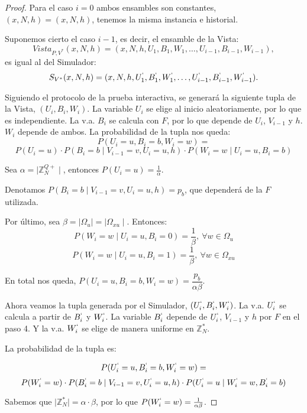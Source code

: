 \begin{proof}
	Para el caso $i=0$ ambos ensambles son constantes, $(x,N,h)=(x,N,h)$, tenemos la misma instancia e historial.
	
	Suponemos cierto el caso $i-1$, es decir, el ensamble de la Vista:
	\[ Vista_{P,V^*}(x,N,h) = (x,N,h,U_1,B_1,W_1,\dots , U_{i-1}, B_{i-1}, W_{i-1}), \]
	es igual al del Simulador:
	\[ S_{V^*}(x,N,h)= (x,N,h,U_1^`,B_1^`,W_1^`,\dots , U_{i-1}^`, B_{i-1}^`, W_{i-1}^`). \]
	
	\hfill

	Siguiendo el protocolo de la prueba interactiva, se generará la siguiente tupla de la Vista, $(U_i, B_i, W_i)$. La variable $U_i$ se elige al inicio aleatoriamente, por lo que es independiente. La v.a. $B_i$ se calcula con $F$, por lo que depende de $U_i$, $V_{i-1}$ y $h$. $W_i$ depende de ambos. La probabilidad de la tupla nos queda:
	\[
	P(U_i=u, B_i=b, W_i=w) = 
	\]
	\[ P(U_i=u)\cdot P(B_i=b \mid V_{i-1}=v, U_i=u,h) \cdot P(W_i=w \mid U_i=u, B_i=b) \]
	
	
	\hfil
	
	Sea $\alpha = \mid \mathbb{Z}^{Q+}_N \mid $, entonces $P(U_i=u) = \frac{1}{\alpha}$.
	
	Denotamos $ P(B_i=b \mid V_{i-1}=v, U_i=u,h)=p_b$, que dependerá de la $F$ utilizada.
	
	Por último, sea $\beta = \mid \Omega_u \mid = \mid \Omega_{xu} \mid $. Entonces:
	\[P(W_i=w \mid U_i=u, B_i=0) = \frac{1}{\beta},\ \forall w \in \Omega_u\]
	\[P(W_i=w \mid U_i=u, B_i=1) = \frac{1}{\beta},\ \forall w \in \Omega_{xu}\]
	
	En total nos queda, $P(U_i=u, B_i=b, W_i=w) = \dfrac{p_b}{\alpha \beta}$.
	
	
	
	\hfil
	
	Ahora veamos la tupla generada por el Simulador, $(U_i^`, B_i^`, W_i^`)$. La v.a. $U_i^`$ se calcula a partir de $B_i^`$ y $W_i^`$. La variable $B_i^`$ depende de $U_i^`$, $V_{i-1}$ y $h$ por $F$ en el paso 4. Y la v.a. $W_i^`$ se elige de manera uniforme en $\mathbb{Z}_N^*$.
	
	La probabilidad de la tupla es:
	
	\[P(U_i^`=u, B_i^`=b, W_i^`=w) = \]
	\[P(W_i^`=w)\cdot P(B_i^`=b \mid V_{i-1}=v, U_i^`=u,h) \cdot P(U_i^`=u \mid W_i^`=w, B_i^`=b)\]
	
	Sabemos que $\mid \mathbb{Z}^*_N \mid = \alpha \cdot \beta $, por lo que $P(W_i^`=w) = \frac{1}{\alpha \beta}$.
	

\end{proof}
